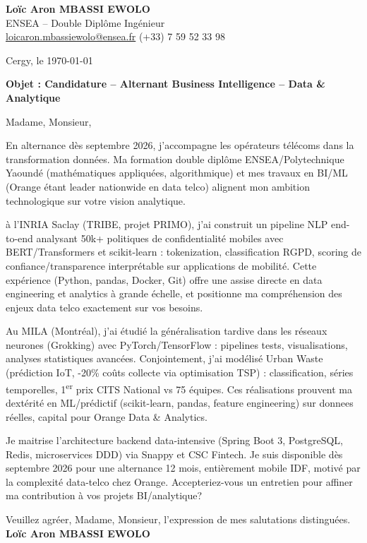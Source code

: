 \documentclass[a4paper,11pt]{article}
\begin{document}
\noindent \textbf{Lo\"ic Aron MBASSI EWOLO} \\
ENSEA -- Double Dipl\^ome Ing\'enieur \\
\href{mailto:loicaron.mbassiewolo@ensea.fr}{loicaron.mbassiewolo@ensea.fr} \quad (+33) 7 59 52 33 98

\vspace{1em}
\noindent Cergy, le \today

\vspace{1em}
\noindent \textbf{Objet : Candidature -- Alternant Business Intelligence -- Data \& Analytique}

\vspace{1.5em}
\noindent Madame, Monsieur,

\vspace{0.8em}
\noindent En alternance d\`es septembre 2026, j'accompagne les op\'erateurs t\'el\'ecoms dans la transformation donn\'ees. Ma formation double dipl\^ome ENSEA/Polytechnique Yaound\'e (math\'ematiques appliqu\'ees, algorithmique) et mes travaux en BI/ML (Orange \'etant leader nationwide en data telco) alignent mon ambition technologique sur votre vision analytique.

\vspace{0.8em}
\noindent \`a l'INRIA Saclay (TRIBE, projet PRIMO), j'ai construit un pipeline NLP end-to-end analysant 50k+ politiques de confidentialit\'e mobiles avec BERT/Transformers et scikit-learn : tokenization, classification RGPD, scoring de confiance/transparence interpr\'etable sur applications de mobilit\'e. Cette exp\'erience (Python, pandas, Docker, Git) offre une assise directe en data engineering et analytics \`a grande \'echelle, et positionne ma compr\'ehension des enjeux data telco exactement sur vos besoins.

\vspace{0.8em}
\noindent Au MILA (Montréal), j'ai \'etudi\'e la g\'en\'eralisation tardive dans les r\'eseaux neurones (Grokking) avec PyTorch/TensorFlow : pipelines tests, visualisations, analyses statistiques avanc\'ees. Conjointement, j'ai mod\'elis\'e Urban Waste (prédiction IoT, -20\% co\^uts collecte via optimisation TSP) : classification, s\'eries temporelles, 1\textsuperscript{er} prix CITS National vs 75 \'equipes. Ces r\'ealisations prouvent ma dext\'erit\'e en ML/pr\'edictif (scikit-learn, pandas, feature engineering) sur donnees r\'eelles, capital pour Orange Data \& Analytics.

\vspace{0.8em}
\noindent Je maitrise l'architecture backend data-intensive (Spring Boot 3, PostgreSQL, Redis, microservices DDD) via Snappy et CSC Fintech. Je suis disponible d\`es septembre 2026 pour une alternance 12 mois, entièrement mobile IDF, motivé par la complexité data-telco chez Orange. Accepteriez-vous un entretien pour affiner ma contribution \`a vos projets BI/analytique?

\vspace{1.5em}
\noindent Veuillez agr\'eer, Madame, Monsieur, l'expression de mes salutations distingu\'ees.
\vspace{2em}
\noindent \textbf{Lo\"ic Aron MBASSI EWOLO}
\end{document}
